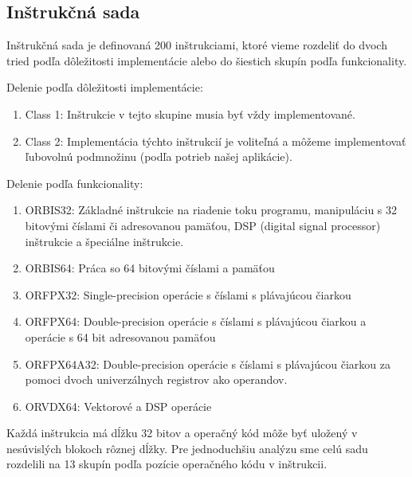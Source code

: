 \documentclass[conference]{IEEEtran}
\begin{document}
\subsection{Inštrukčná sada}

Inštrukčná sada je definovaná 200 inštrukciami, ktoré vieme rozdeliť do dvoch tried podľa dôležitosti implementácie alebo do šiestich skupín podľa funkcionality.

Delenie podľa dôležitosti implementácie:

\begin{enumerate}
  \item Class 1: Inštrukcie v tejto skupine musia byť vždy implementované.
  \item Class 2: Implementácia týchto inštrukcií je voliteľná a môžeme implementovať ľubovolnú podmnožinu (podľa potrieb našej aplikácie).
\end{enumerate}

Delenie podľa funkcionality:

\begin{enumerate}
	\item ORBIS32: Základné inštrukcie na riadenie toku programu, manipuláciu s 32 bitovými číslami či adresovanou pamäťou, DSP (digital signal processor) inštrukcie a špeciálne inštrukcie.
	\item ORBIS64: Práca so 64 bitovými číslami a pamäťou
	\item ORFPX32: Single-precision operácie s číslami s plávajúcou čiarkou
	\item ORFPX64: Double-precision operácie s číslami s plávajúcou čiarkou a operácie s 64 bit adresovanou pamäťou
	\item ORFPX64A32: Double-precision operácie s číslami s plávajúcou čiarkou za pomoci dvoch univerzálnych registrov ako operandov.
	\item ORVDX64: Vektorové a DSP operácie
\end{enumerate}

Každá inštrukcia má dĺžku 32 bitov a operačný kód môže byť uložený v nesúvislých blokoch rôznej dĺžky. Pre jednoduchšiu analýzu sme celú sadu rozdelili na 13 skupín podľa pozície operačného kódu v inštrukcii.
\end{document}
